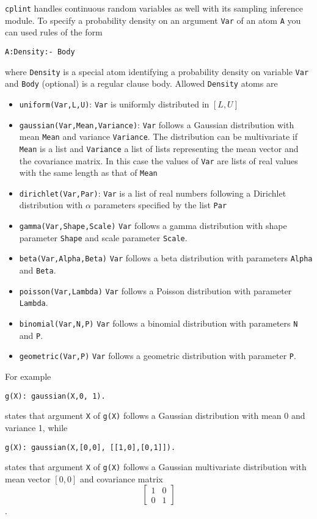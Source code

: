 \verb|cplint| handles continuous random variables as well with its
sampling inference module.
To specify a probability density on an argument \verb|Var| of an atom
\verb|A| you can used rules of the form
\begin{verbatim}
A:Density:- Body
\end{verbatim}
where \verb|Density| is a special atom identifying a probability  density on variable \verb|Var| and \verb|Body| (optional) is a regular clause body.
Allowed \verb|Density| atoms are
\begin{itemize}
\item \verb|uniform(Var,L,U)|: \verb|Var| is uniformly distributed in $[L,U]$
\item \verb|gaussian(Var,Mean,Variance)|: \verb|Var| follows a Gaussian distribution with mean \verb|Mean| and variance \verb|Variance|. The distribution can be multivariate if \verb|Mean| 
is a list and \verb|Variance| a list of lists representing the mean vector and the covariance matrix. In this case the values of \verb|Var| are lists of real values with the same length as
that of \verb|Mean|
\item \verb|dirichlet(Var,Par)|: \verb|Var| is a list of real
numbers following a Dirichlet distribution with $\alpha$ parameters specified
by the list \verb|Par|
\item \verb|gamma(Var,Shape,Scale)|  \verb|Var| follows a gamma distribution 
with shape parameter \verb|Shape| and scale parameter \verb|Scale|.
\item \verb|beta(Var,Alpha,Beta)|  \verb|Var| follows a beta distribution 
with parameters \verb|Alpha| and \verb|Beta|.
\item \verb|poisson(Var,Lambda)|  \verb|Var| follows a Poisson distribution 
with parameter \verb|Lambda|.
\item \verb|binomial(Var,N,P)|  \verb|Var| follows a binomial distribution 
with parameters \verb|N| and \verb|P|.
\item \verb|geometric(Var,P)|  \verb|Var| follows a geometric distribution 
with parameter \verb|P|.
\end{itemize}
For example
\begin{verbatim}
g(X): gaussian(X,0, 1).
\end{verbatim}
states that argument \verb|X| of \verb|g(X)| follows a Gaussian 
distribution with mean 0 and variance 1, while
\begin{verbatim}
g(X): gaussian(X,[0,0], [[1,0],[0,1]]).
\end{verbatim}
states that argument \verb|X| of \verb|g(X)| follows a Gaussian 
multivariate distribution with mean vector $[0,0]$ and covariance matrix
$$\left[\begin{array}{rr}
1&0\\
0&1
\end{array}\right]$$.



